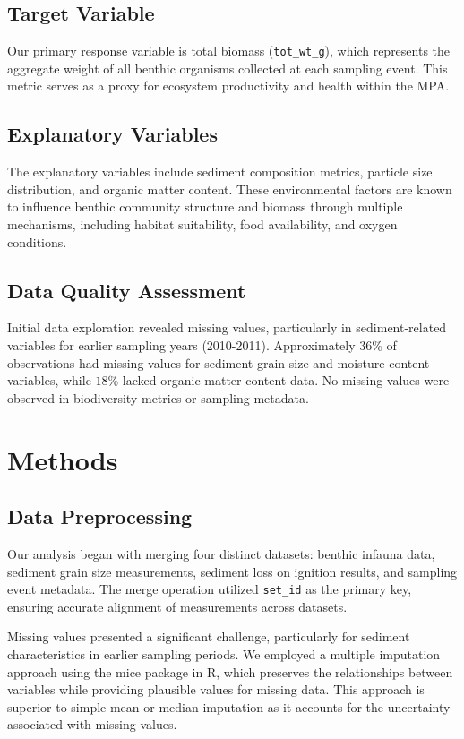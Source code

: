 \documentclass[12pt]{article}
\begin{document}
\subsection{Target Variable}

\qquad Our primary response variable is total biomass (\texttt{tot\_wt\_g}), which represents the aggregate weight of all benthic organisms collected at each sampling event. This metric serves as a proxy for ecosystem productivity and health within the MPA.

\subsection{Explanatory Variables}

\qquad The explanatory variables include sediment composition metrics, particle size distribution, and organic matter content. These environmental factors are known to influence benthic community structure and biomass through multiple mechanisms, including habitat suitability, food availability, and oxygen conditions.

\subsection{Data Quality Assessment}

\qquad Initial data exploration revealed missing values, particularly in sediment-related variables for earlier sampling years (2010-2011). Approximately $36\%$ of observations had missing values for sediment grain size and moisture content variables, while $18\%$ lacked organic matter content data. No missing values were observed in biodiversity metrics or sampling metadata.


\newpage
\section{Methods}

\subsection{Data Preprocessing}

\qquad Our analysis began with merging four distinct datasets: benthic infauna data, sediment grain size measurements, sediment loss on ignition results, and sampling event metadata. The merge operation utilized \texttt{set\_id} as the primary key, ensuring accurate alignment of measurements across datasets.

\qquad Missing values presented a significant challenge, particularly for sediment characteristics in earlier sampling periods. We employed a multiple imputation approach using the mice package in R, which preserves the relationships between variables while providing plausible values for missing data. This approach is superior to simple mean or median imputation as it accounts for the uncertainty associated with missing values.
\end{document}
